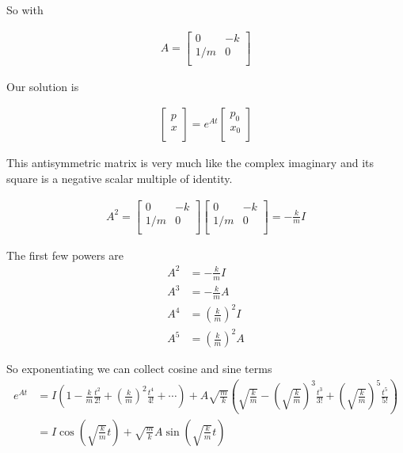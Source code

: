 So with 

\begin{align}\label{eqn:hamiltonian:woo5}
A = 
\begin{bmatrix}
0 & - k \\
1/m & 0 \\
\end{bmatrix}
\end{align}

Our solution is 

\begin{align}\label{eqn:hamiltonian:woo6}
\begin{bmatrix}
p \\
x \\
\end{bmatrix}
=
e^{At}
\begin{bmatrix}
p_0 \\
x_0 \\
\end{bmatrix}
\end{align}

This antisymmetric matrix is very much like the complex imaginary and its square is a negative scalar multiple of identity.

\begin{align}\label{eqn:hamiltonian:woo7}
A^2 =
\begin{bmatrix}
0 & - k \\
1/m & 0 \\
\end{bmatrix}
\begin{bmatrix}
0 & - k \\
1/m & 0 \\
\end{bmatrix}
=
-\frac{k}{m} I
\end{align}

The first few powers are 
\begin{align}\label{eqn:hamiltonian:woo8}
A^2 &= -\frac{k}{m} I \\
A^3 &= -\frac{k}{m} A \\
A^4 &= \left(\frac{k}{m}\right)^2 I \\
A^5 &= \left(\frac{k}{m}\right)^2 A
\end{align}

So exponentiating we can collect cosine and sine terms
\begin{align*}
e^{At} 
&= I \left( 1 - \frac{k}{m} \frac{t^2}{2!} + \left( \frac{k}{m} \right)^2 \frac{t^4}{4!} + \cdots \right) 
+ A\sqrt{\frac{m}{k}} \left( \sqrt{\frac{k}{m}} - \left(\sqrt{\frac{k}{m}}\right)^3 \frac{t^3}{3!} + \left(\sqrt{\frac{k}{m}}\right)^5 \frac{t^5}{5!} \right) \\
&= 
I \cos\left(\sqrt{\frac{k}{m}} t\right) + \sqrt{\frac{m}{k}} A \sin\left(\sqrt{\frac{k}{m}} t\right)
\end{align*}

